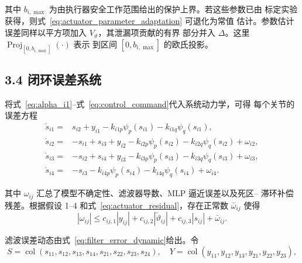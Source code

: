 \documentclass{article}
\begin{document}
其中 $b_{i,\max}$ 为由执行器安全工作范围给出的保护上界。若这些参数已由
标定实验获得，则式~\eqref{eq:actuator_parameter_adaptation} 可退化为常值
估计。参数估计误差同样以平方项加入 $V_\vartheta$，其泄漏项贡献的有界
部分并入 $\Delta$。这里 $\operatorname{Proj}_{[0,b_{i,\max}]}(\cdot)$ 表示
到区间 $[0,b_{i,\max}]$ 的欧氏投影。

\subsection{3.4 闭环误差系统}
\label{subsec:closed_loop}

将式~\eqref{eq:alpha_i1}--式~\eqref{eq:control_command}代入系统动力学，可得
每个关节的误差方程
\begin{equation}
\begin{aligned}
 \dot s_{i1}={}&s_{i2}+y_{i1}-k_{i1p}\psi_p(s_{i1})
                         -k_{i1q}\psi_q(s_{i1}),\\
 \dot s_{i2}={}&-s_{i1}+s_{i3}+y_{i2}-k_{i2p}\psi_p(s_{i2})
                         -k_{i2q}\psi_q(s_{i2})+\omega_{i2},\\
 \dot s_{i3}={}&-s_{i2}+s_{i4}+y_{i3}-k_{i3p}\psi_p(s_{i3})
                         -k_{i3q}\psi_q(s_{i3})+\omega_{i3},\\
 \dot s_{i4}={}&-s_{i3}-k_{i4p}\psi_p(s_{i4})
                         -k_{i4q}\psi_q(s_{i4})+\omega_{i4}.
\end{aligned}

 \tag{60}
\label{eq:error_dynamics_scalar}
\end{equation}

其中 $\omega_{ij}$ 汇总了模型不确定性、滤波器导数、MLP 逼近误差以及死区--
滞环补偿残差。根据假设 1--4 和式~\eqref{eq:actuator_residual}，存在正常数
$\bar\omega_{ij}$ 使得
\begin{equation}
 |\omega_{ij}|\leq c_{ij,1}|y_{ij}|+c_{ij,2}|\widetilde\vartheta_{ij}|
 +c_{ij,3}|s_{ij}|+\bar\omega_{ij} .

 \tag{61}
\label{eq:omega_bound}
\end{equation}

滤波误差动态由式~\eqref{eq:filter_error_dynamic}给出。令
\begin{equation}
 S=\operatorname{col}(s_{11},s_{12},s_{13},s_{14},
                       s_{21},s_{22},s_{23},s_{24}),
 \quad
 Y=\operatorname{col}(y_{11},y_{12},y_{13},y_{21},y_{22},y_{23}),

 \tag{62}
\label{eq:S_Y_definition}
\end{equation}
\end{document}
